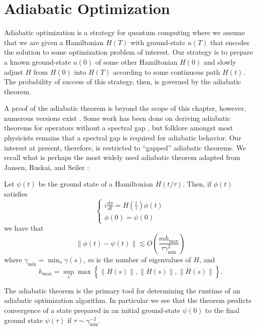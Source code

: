 \section{Adiabatic Optimization}\label{sec:adiabatic-optimization}

Adiabatic optimization is a strategy for quantum computing where we assume that we are given a Hamiltonian $H(T)$ with ground-state $u(T)$ that encodes the solution to some optimization problem of interest. Our strategy is to prepare a known ground-state $u(0)$ of some other Hamiltonian $H(0)$ and slowly adjust $H$ from $H(0)$ into $H(T)$ according to some continuous path $H(t)$. The probability of success of this strategy, then, is governed by the adiabatic theorem. 

A proof of the adiabatic theorem is beyond the scope of this chapter, however, numerous versions exist \cite{kato1950adiabatic,JRS07,Venuti2015}. Some work has been done on  deriving adiabatic theorems for operators without a spectral gap \cite{schmid2014adiabatic,avron1999adiabatic,avron1998adiabatic}, but folklore amongst most physicists remains that a spectral gap is required for adiabatic behavior. Our interest at present, therefore, is restricted to ``gapped'' adiabatic theorems. We recall what is perhaps the most widely used adiabatic theorem adapted from Jansen, Ruskai, and Seiler \cite[Theorem 4]{JRS07}:

\begin{thm}\label{thm:adiabatic}
    Let $\psi(t)$ be the ground state of a Hamiltonian $H(t/\tau)$. Then, if $\phi(t)$ satisfies 
    \[
	    \begin{cases}
    		i \frac{d \phi}{d t} = H\left(\frac{t}{\tau}\right) \phi(t) \\
    		\phi(0) = \psi(0)
    	\end{cases}
    \]
    we have that
    \[
    	\lVert \phi(t) - \psi(t) \rVert \lesssim O\left(\frac{m h_\max}{\tau \gamma_\min^2}\right)
    \]
    where $\gamma_\min = \min_s \gamma(s)$, $m$ is the number of eigenvalues of $H$, and 
    \[ 
    	h_\max = \sup_s \max\left\{\lVert H(s) \rVert, \allowbreak \lVert \dot{H}(s) \rVert \allowbreak, \lVert \stackrel{\dots}{H}(s) \rVert\right\}.
    \]
\end{thm}

The adiabatic theorem is the primary tool for determining the runtime of an adiabatic optimization algorithm. In particular we see that the theorem predicts convergence of a state prepared in an initial ground-state $\psi(0)$ to the final ground state $\psi(\tau)$ if $\tau \sim \gamma_\min^{-2}$. 

